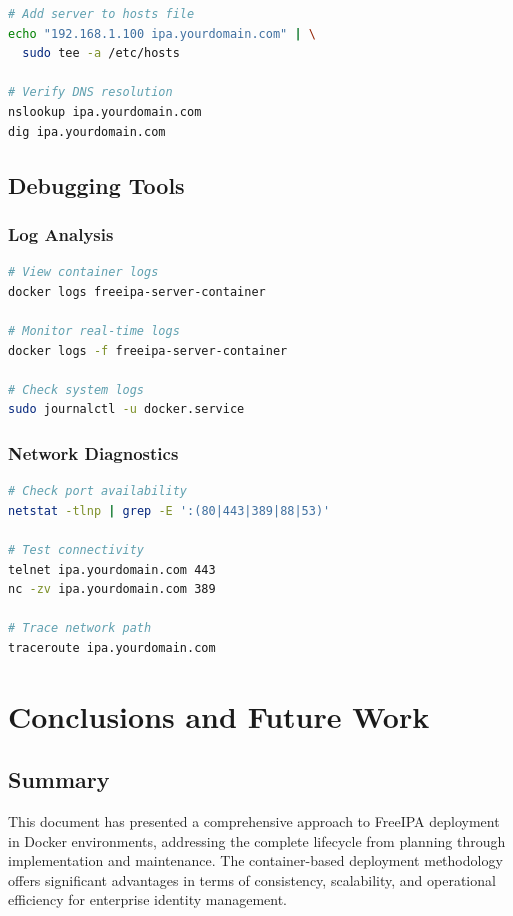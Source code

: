 \documentclass[12pt,a4paper]{report}
\begin{document}
\begin{lstlisting}[language=bash,caption=Configure DNS Resolution]
# Add server to hosts file
echo "192.168.1.100 ipa.yourdomain.com" | \
  sudo tee -a /etc/hosts

# Verify DNS resolution
nslookup ipa.yourdomain.com
dig ipa.yourdomain.com
\end{lstlisting}

\section{Debugging Tools}

\subsection{Log Analysis}

\begin{lstlisting}[language=bash,caption=Log Analysis Commands]
# View container logs
docker logs freeipa-server-container

# Monitor real-time logs
docker logs -f freeipa-server-container

# Check system logs
sudo journalctl -u docker.service
\end{lstlisting}

\subsection{Network Diagnostics}

\begin{lstlisting}[language=bash,caption=Network Diagnostic Commands]
# Check port availability
netstat -tlnp | grep -E ':(80|443|389|88|53)'

# Test connectivity
telnet ipa.yourdomain.com 443
nc -zv ipa.yourdomain.com 389

# Trace network path
traceroute ipa.yourdomain.com
\end{lstlisting}

\chapter{Conclusions and Future Work}

\section{Summary}

This document has presented a comprehensive approach to FreeIPA deployment in Docker environments, addressing the complete lifecycle from planning through implementation and maintenance. The container-based deployment methodology offers significant advantages in terms of consistency, scalability, and operational efficiency for enterprise identity management.
\end{document}
